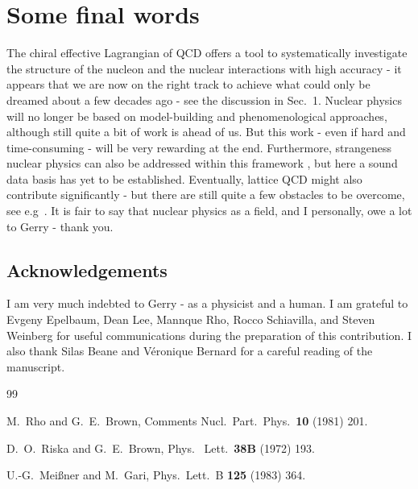 \documentclass[a4paper,fleqn]{scrartcl}
\begin{document}
{\section{Some final words}

The chiral effective Lagrangian of QCD offers a tool to systematically
investigate the structure of the nucleon and the nuclear interactions with 
high accuracy - it appears that we are now on the right track to achieve 
what could only be dreamed about a few decades ago - see the discussion in
Sec.~1. Nuclear physics will no longer be based on model-building and phenomenological
approaches, although still quite a bit of work is ahead of us. But this
work - even if hard and time-consuming - will be very rewarding
at the end. Furthermore, strangeness nuclear physics can also be addressed
within this framework \cite{SNP}, but here a sound data basis has yet to be established.
Eventually, lattice QCD might also contribute significantly - but there
are still quite a few obstacles to be overcome, see e.g~\cite{Beane:2009mb}.
It is fair to say that  nuclear physics as a field, and I personally,
owe a lot to Gerry - thank you.


\subsection*{Acknowledgements}

I am very much indebted to Gerry - as a physicist and a human.
I am grateful to Evgeny Epelbaum, Dean Lee, Mannque Rho, Rocco Schiavilla,  
and Steven Weinberg for useful communications during the preparation 
of this contribution. I also thank Silas Beane and V\'eronique Bernard for
a careful reading of the manuscript.




\begin{thebibliography}{99}

  M.~Rho and G.~E.~Brown,
  Comments Nucl.\ Part.\ Phys.\  {\bf 10} (1981) 201.

  D.~O.~Riska and G.~E.~Brown,
  Phys. \ Lett.\ {\bf 38B} (1972) 193.

  U.-G.~Mei\ss ner and M.~Gari,
  Phys.\ Lett.\  B {\bf 125} (1983) 364.


\end{thebibliography}}
\end{document}
